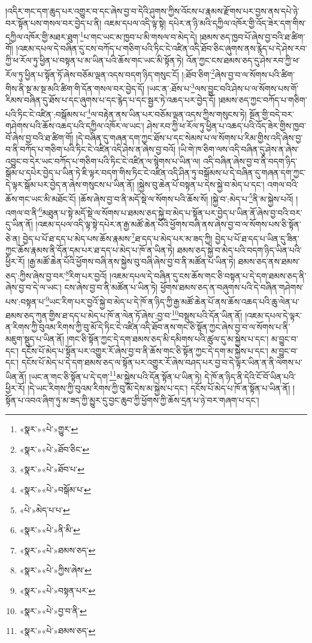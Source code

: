 །འདིར་གང་དག་ཆུད་པར་འགྱུར་བ་དང་ཞེས་བྱ་བ་དེའི་ཤུགས་ཀྱིས་འོངས་པ་རྣམས་རྫོགས་པར་བྱས་ནས་དཔེ་ཉེ་བར་སྟོན་པས་གསལ་བར་བྱེད་པ་ནི། འཇམ་དཔལ་འདི་ལྟ་སྟེ། དཔེར་ན་ཉི་མའི་དཀྱིལ་འཁོར་གྱི་འོད་ཟེར་དག་གིས་དཀྱིལ་འཁོར་གྱི་མཐར་ཐུག་\footnote{«སྣར་»«པེ་»གྱུར་}པ་གང་ཡང་མ་ཁྱབ་པ་མི་གསལ་བ་མེད་དེ། །ཐམས་ཅད་ཁྱབ་པོ་ཞེས་བྱ་བའི་ཐ་ཚིག་གོ། །འཇམ་དཔལ་དེ་བཞིན་དུ་ངས་བཀོད་པ་གཅིག་པའི་ཏིང་ངེ་འཛིན་འདི་ཐོབ་ཅིང་ཞུགས་ནས་རྙེད་པ་དེ་ཤེས་རབ་ཀྱི་ཕ་རོལ་ཏུ་ཕྱིན་པ་བསྟན་པ་མ་ཡིན་པའི་ཆོས་གང་ཡང་མི་སྟོན་ཏེ། འོན་ཀྱང་ངས་ཐམས་ཅད་དུ་ཤེས་རབ་ཀྱི་ཕ་རོལ་ཏུ་ཕྱིན་པ་སྟོན་ཏོ་ཞེས་བཅོམ་ལྡན་འདས་བདག་ཉིད་གསུང་ངོ། །:ཐོབ་ཅིག་\footnote{«སྣར་»«པེ་»ཐོབ་ཅིང་}ཞེས་བྱ་བ་ལ་སོགས་པའི་ཚིག་གིས་ནི་སྔ་མ་སྔ་མའི་ཚིག་གི་དོན་གསལ་བར་བྱེད་དོ། །ཡང་ན་:ཐོས་པ་\footnote{«སྣར་»«པེ་»ཐོབ་པ་}ལས་བྱུང་བའི་ཤེས་པ་ལ་སོགས་པས་གོ་རིམས་བཞིན་དུ་ཐོས་པ་དང་ཞུགས་པ་དང་རྙེད་པ་དང་སྦྱར་ཏེ་འཆད་པར་བྱེད་དོ། །ཐམས་ཅད་ཀྱང་བཀོད་པ་གཅིག་པའི་ཏིང་ངེ་འཛིན་:བསྒོམས་པ་\footnote{«སྣར་»«པེ་»བསྒོམ་པ་}ལ་བརྟེན་ནས་ཡིན་པར་བཅོམ་ལྡན་འདས་ཀྱིས་གསུངས་ཏེ། སྔོན་གྱི་བདེ་བར་གཤེགས་པའི་ཆོས་འཆད་པའི་དཀྱིལ་འཁོར་ལ་ཡང་། ཤེས་རབ་ཀྱི་ཕ་རོལ་ཏུ་ཕྱིན་པ་འཆད་པའི་འོད་ཟེར་གྱིས་ཁྱབ་བོ་ཞེས་བྱ་བའི་ཐ་ཚིག་གོ། །དེ་བཞིན་དུ་གཞན་དག་ཀྱང་ཐོས་པ་དང་སེམས་པ་ལ་སོགས་པ་རིམ་གྱིས་འདི་ཞེས་བྱ་བ་ནི་བཀོད་པ་གཅིག་པའི་ཏིང་ངེ་འཛིན་འདི་ཤེས་ན་ཞེས་བྱ་བའོ། །ཡི་གེ་ཁ་ཅིག་ལས་འདི་བཞིན་དུ་ཤེས་ན་ཞེས་འབྱུང་བ་དེར་ཡང་བཀོད་པ་གཅིག་པའི་ཏིང་ངེ་འཛིན་ལ་སྙེགས་པ་ཡིན་ལ། འདི་བཞིན་ཞེས་བྱ་བ་ནི་བདག་ཉིད་སྒོམ་པ་དཔེར་བྱེད་པ་ཡིན་ཏེ་ཇི་ལྟར་བདག་གིས་ཏིང་ངེ་འཛིན་འདི་ཤིན་ཏུ་བསྒོམས་པ་དེ་བཞིན་དུ་གཞན་དག་ཀྱང་དེ་ལྟར་སྒོམ་པར་བྱེད་ན་ཞེས་གསུངས་པ་ཡིན་ནོ། །སྐྱེས་བུ་ཆེན་པོ་བསྟན་པ་དེས་སྐྱེ་བ་མེད་པ་དང་། འགལ་བའི་ཆོས་གང་ཡང་མི་མཐོང་ངོ། །ཆོས་ཞེས་བྱ་བ་ནི་མདོ་སྡེ་ལ་སོགས་པའི་ཆོས་སོ། །སྐྱེ་བ་:མེད་པ་\footnote{«པེ་»མེད་པ་པ་}ནི་མ་སྐྱེས་པའོ། །འགལ་བ་ནི་\footnote{«སྣར་»«པེ་»ནི་མི་}མཐུན་པ་སྟེ་མདོ་སྡེ་ལ་སོགས་པ་ཐམས་ཅད་སྐྱེ་བ་མེད་པ་སྟོན་པར་བྱེད་པ་ཡིན་ནོ་ཞེས་བྱ་བའི་བར་དུ་ཡིན་ནོ། །འཇམ་དཔལ་འདི་ལྟ་སྟེ་དཔེར་ན་རྒྱ་མཚོ་ཆེན་པོའི་ཕྱོགས་བཞི་ནས་ཞེས་བྱ་བ་ལ་སོགས་པས་ཅི་སྟོན་ཅེ་ན། བྱེད་པ་པོ་ཐ་དད་པ་མེད་པས་ཆོས་རྣམས་\footnote{«སྣར་»«པེ་»ཐམས་ཅད་}ཐ་དད་པ་མེད་པར་མ་ཟད་ཀྱི། བྱེད་པ་པོ་ཐ་དད་པ་ཡིན་དུ་ཟིན་ཀྱང་ཆོས་རྣམས་ནི་དོན་དམ་པར་ཐ་དད་པ་མེད་པ་ཁོ་ན་ཡིན་ཏེ། ཐམས་ཅད་སྐྱེ་བ་མེད་པའི་བདག་ཉིད་ཡིན་པའི་ཕྱིར་རོ། །རྒྱ་མཚོ་ཆེན་པོའི་ཕྱོགས་བཞི་ནས་སྐྱེས་བུ་བཞི་ཞེས་བྱ་བ་ནི་མཚོན་པ་ཡིན་ཏེ། ཐམས་ཅད་ནས་ཐམས་ཅད་:ཀྱིས་ཞེས་བྱ་བར་\footnote{«སྣར་»«པེ་»ཀྱིས་ཞེས་}རིག་པར་བྱའོ། །འཇམ་དཔལ་དེ་བཞིན་དུ་ངས་ཆོས་གང་ཅི་བསྟན་པ་དེ་དག་ཐམས་ཅད་ནི་ཞེས་བྱ་བ་དེ་ལ་ཡང་། ངས་ཞེས་བྱ་བ་ནི་མཚོན་པ་ཡིན་ཏེ། ཕྱོགས་ཐམས་ཅད་ན་བཞུགས་པའི་དེ་བཞིན་གཤེགས་པས་:བསྟན་པ་\footnote{«སྣར་»«པེ་»བསྟན་པར་}ཡང་རིག་པར་བྱའོ་སྐྱེ་བ་མེད་པ་དེ་ཁོ་ན་ཉིད་ཀྱི་རྒྱ་མཚོ་ཆེན་པོ་ནས་ཆོས་འཆད་པའི་ཆུ་ལེན་པ་ཐམས་ཅད་ཀུན་གྱིས་ཐ་དད་པ་མེད་པ་ཁོ་ན་ལེན་ཏོ་ཞེས་:བྱ་བ་\footnote{«སྣར་»«པེ་»བྱ་བ་ནི་}བསྡུས་པའི་དོན་ཡིན་ནོ། །འཇམ་དཔལ་དེ་ལྟར་ན་རིགས་ཀྱི་བུའམ་རིགས་ཀྱི་བུ་མོ་དེ་ཏིང་ངེ་འཛིན་འདི་ཐོབ་ནས་གང་ཅི་སྟོན་ཀྱང་ཞེས་བྱ་བ་ལ་སོགས་པ་ནི་མཇུག་སྡུད་པ་ཡིན་ནོ། །གང་ཅི་སྟོན་ཀྱང་དེ་དག་ཐམས་ཅད་མི་དམིགས་པའི་ཚུལ་དུ་མ་སྐྱེས་པ་དང་། མ་བྱུང་བ་དང་། དངོས་པོ་མེད་པ་སྟོན་པར་འགྱུར་རོ་ཞེས་བྱ་བ་ནི་ཆོས་གང་ཅི་སྟོན་ཀྱང་དེ་དག་མ་སྐྱེས་པ་དང་། མ་བྱུང་བ་དང་། དངོས་པོ་མེད་པ་དེ་དག་ཐམས་ཅད་ལ་སྟོན་པར་འགྱུར་རོ་ཞེས་བཤད་པར་བྱ་བ་དེ་ལྟར་ཡིན་ན་ནི་ལེགས་པ་ཡིན་ནོ། །ཡང་ན་གང་ཅི་སྟོན་པ་དེ་དག་\footnote{«སྣར་»«པེ་»ཐམས་ཅད་}མ་སྐྱེས་པའི་དོན་སྟོན་པ་ཡིན་ཏེ། དེ་ཁོ་ན་ཉིད་ནི་དེའི་ངོ་བོ་ཡིན་པའི་ཕྱིར་རོ། །དེ་ཡང་རིགས་ཀྱི་བུའམ་རིགས་ཀྱི་བུ་མོ་དེས་མ་སྐྱེས་པ་དང་། དངོས་པོ་མེད་པ་ཁོ་ན་སྟོན་པ་ཡིན་ནོ། །སྟོན་པ་འབའ་ཞིག་ཏུ་མ་ཟད་ཀྱི་མྱུར་དུ་བྱང་ཆུབ་ཀྱི་ཕྱོགས་ཀྱི་ཆོས་དྲན་པ་ཉེ་བར་གཞག་པ་དང་། 